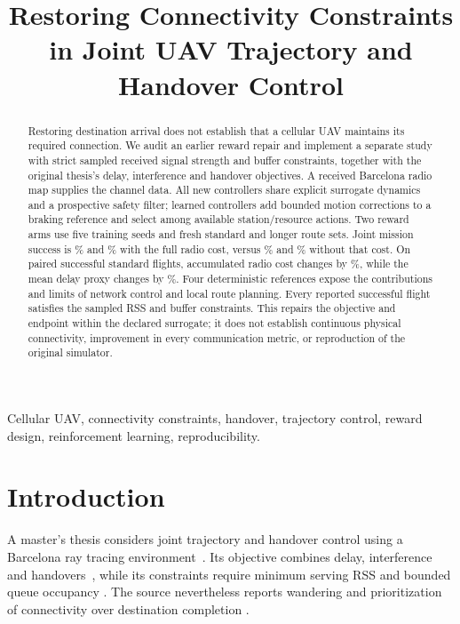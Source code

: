 \documentclass[conference]{IEEEtran}
\title{Restoring Connectivity Constraints in Joint UAV Trajectory and Handover Control}
\author{\IEEEauthorblockN{Guillem Moreno Garcia and Evgenii Vinogradov}
\IEEEauthorblockA{Universitat Polit\`ecnica de Catalunya, Barcelona, Spain\\Research draft, 12 September 2026}}
\begin{document}
\maketitle
\begin{abstract}
Restoring destination arrival does not establish that a cellular UAV maintains
its required connection. We audit an earlier reward repair and implement a
separate study with strict sampled received signal strength and buffer
constraints, together with the original thesis's delay, interference and
handover objectives. A received Barcelona radio map supplies the channel data.
All new controllers share explicit surrogate dynamics and a prospective safety
filter; learned controllers add bounded motion corrections to a braking
reference and select among available station/resource actions. Two reward arms
use five training seeds and fresh standard and longer route sets. Joint mission
success is \FullStd\% and \FullLong\% with the full radio cost, versus
\ArrivalStd\% and \ArrivalLong\% without that cost. On paired successful
standard flights, accumulated radio cost changes by \CostChangeStd\%, while
the mean delay proxy changes by \DelayChangeStd\%. Four deterministic
references expose the contributions and limits of network control and local
route planning. Every reported successful flight satisfies the sampled RSS and
buffer constraints. This repairs the objective and endpoint within the declared
surrogate; it does not establish continuous physical connectivity, improvement
in every communication metric, or reproduction of the original simulator.
\end{abstract}
\begin{IEEEkeywords}
Cellular UAV, connectivity constraints, handover, trajectory control, reward
design, reinforcement learning, reproducibility.
\end{IEEEkeywords}

\section{Introduction}
A master's thesis considers joint trajectory and handover control using a
Barcelona ray tracing environment~\cite[pp.~6--7, Sec.~3.1]{thesis}. Its objective
combines delay, interference and handovers~\cite[p.~10, Eq.~(11)]{thesis}, while
its constraints require minimum serving RSS and bounded queue occupancy
\cite[p.~11, Eq.~(12), C2 and C4]{thesis}. The source nevertheless reports
wandering and prioritization of connectivity over destination completion
\cite[p.~19, Sec.~7.2; p.~21, Sec.~8]{thesis}.
\end{document}

